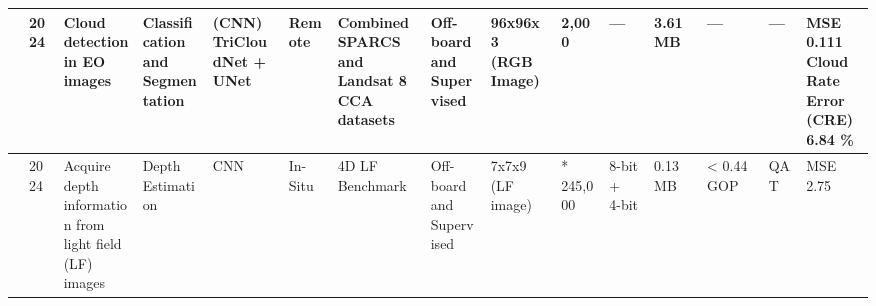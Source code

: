 \begin{center}
{\begin{tabular}{lllllllllllllll}
\cite{kimOnOrbitAICloud2024} & 2024 & \makecell[tl]{Cloud detection\\ in EO images} & \makecell[tl]{Classification\\ and\\ Segmentation} & \makecell[tl]{(CNN)\\ TriCloudNet +\\ UNet} & Remote & \makecell[tl]{Combined SPARCS\\ and Landsat 8\\ CCA datasets} & \makecell[tl]{Off-board\\ and\\ Supervised} & \makecell[tl]{96x96x3\\ (RGB Image)} & 2,000 & --- & 3.61 MB & --- & --- & \makecell[tl]{MSE 0.111\\ Cloud Rate\\ Error (CRE)\\ 6.84 \%}  \\ \hline
\cite{liFPGABasedLowBitLightweight2025} & 2024 & \makecell[tl]{Acquire depth\\ information from\\ light field (LF)\\ images} & \makecell[tl]{Depth\\ Estimation} & CNN & In-Situ & \makecell[tl]{4D LF\\ Benchmark} & \makecell[tl]{Off-board\\ and\\ Supervised} & \makecell[tl]{7x7x9\\ (LF image)} & * 245,000 & \makecell[tl]{8-bit +\\ 4-bit} & 0.13 MB & < 0.44 GOP & QAT & MSE 2.75 \\
\bottomrule
\end{tabular}}
\end{center}

